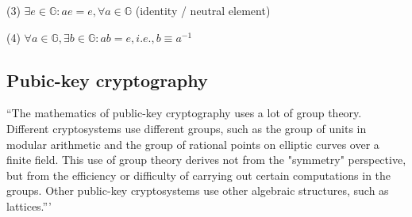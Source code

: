 \documentclass[twocolumn]{article}
\begin{document}
(3) $\exists e \in \mathbb{G}: ae=e, \forall a \in \mathbb{G}$ (identity / neutral element)

(4) $\forall a \in \mathbb{G}, \exists b \in \mathbb{G}: ab=e, i.e., b\equiv a^{-1}$

\subsection{Pubic-key cryptography}
``The mathematics of public-key cryptography uses a lot of group theory. Different cryptosystems use different groups, such as the group of units in modular arithmetic and the group of rational points on elliptic curves over a finite field. This use of group theory derives not from the "symmetry" perspective, but from the efficiency or difficulty of carrying out certain computations in the groups. Other public-key cryptosystems use other algebraic structures, such as lattices.''' \cite{Cardelli:1996:TS:234313.234418}



\end{document}
